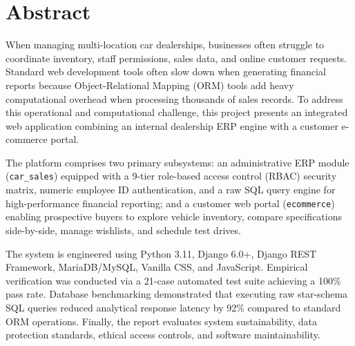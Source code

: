 \chapter*{Abstract}

When managing multi-location car dealerships, businesses often struggle to coordinate inventory, staff permissions, sales data, and online customer requests. Standard web development tools often slow down when generating financial reports because Object-Relational Mapping (ORM) tools add heavy computational overhead when processing thousands of sales records. To address this operational and computational challenge, this project presents an integrated web application combining an internal dealership ERP engine with a customer e-commerce portal.

The platform comprises two primary subsystems: an administrative ERP module (\texttt{car\_sales}) equipped with a 9-tier role-based access control (RBAC) security matrix, numeric employee ID authentication, and a raw SQL query engine for high-performance financial reporting; and a customer web portal (\texttt{ecommerce}) enabling prospective buyers to explore vehicle inventory, compare specifications side-by-side, manage wishlists, and schedule test drives.

The system is engineered using Python 3.11, Django 6.0+, Django REST Framework, MariaDB/MySQL, Vanilla CSS, and JavaScript. Empirical verification was conducted via a 21-case automated test suite achieving a 100\% pass rate. Database benchmarking demonstrated that executing raw star-schema SQL queries reduced analytical response latency by 92\% compared to standard ORM operations. Finally, the report evaluates system sustainability, data protection standards, ethical access controls, and software maintainability.

\vspace{0.5cm}
